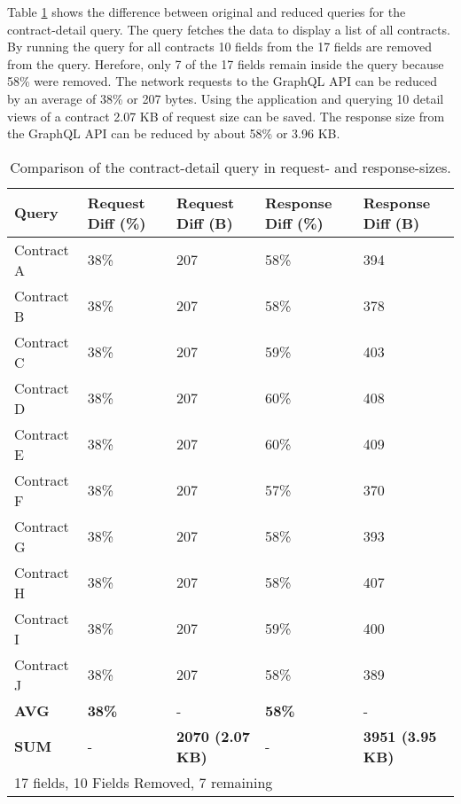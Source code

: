 \noindent Table \ref{table:code:comparison-contract-reduction} shows the difference between original and reduced queries for the contract-detail query. The query fetches the data to display a list of all contracts. By running the query for all contracts 10 fields from the 17 fields are removed from the query. Herefore, only 7 of the 17 fields remain inside the query because 58\% were removed. The network requests to the GraphQL \ac{API} can be reduced by an average of 38\% or 207 bytes. Using the application and querying 10 detail views of a contract 2.07 KB of request size can be saved. The response size from the GraphQL \ac{API} can be reduced by about 58\% or 3.96 KB.

\ifshowTables
\begin{table}[H]
  \begin{tabular}{|l|l|l|l|l|}
  \hline
  \textbf{Query} & \textbf{Request Diff (\%)}  & \textbf{Request Diff (B)} & \textbf{Response Diff (\%)} & \textbf{Response Diff (B)}  \\
  \hline
  Contract A & 38\% & 207 & 58\% & 394 \\
  \hline
  Contract B & 38\% & 207 & 58\% & 378 \\
  \hline
  Contract C & 38\% & 207 & 59\% & 403 \\
  \hline
  Contract D & 38\% & 207 & 60\% & 408 \\
  \hline
  Contract E & 38\% & 207 & 60\% & 409 \\
  \hline
  Contract F & 38\% & 207 & 57\% & 370 \\
  \hline
  Contract G & 38\% & 207 & 58\% & 393 \\
  \hline
  Contract H & 38\% & 207 & 58\% & 407 \\
  \hline
  Contract I  & 38\% & 207 & 59\% & 400 \\
  \hline
  Contract J & 38\% & 207 & 58\% & 389 \\
  \hline
  \hline
  \textbf{AVG} & \textbf{38\%} & - & \textbf{58\%} & - \\
  \hline
  \hline
  \textbf{SUM} & - & \textbf{2070 (2.07 KB)} & - & \textbf{3951 (3.95 KB)} \\
  \hline
  \multicolumn{5}{l}{17 fields, 10 Fields Removed, 7 remaining}
  \end{tabular}
  \caption{Comparison of the contract-detail query in request- and response-sizes.}\label{table:code:comparison-contract-reduction}
\end{table}
\fi